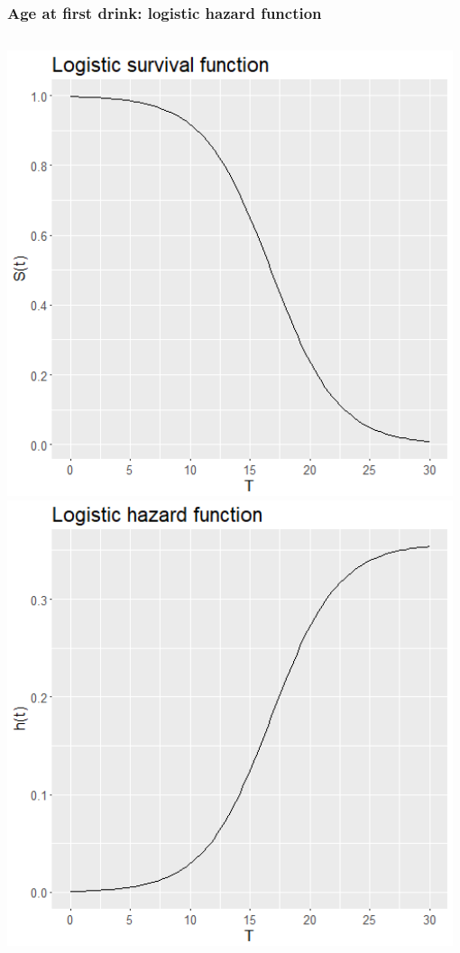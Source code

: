 \begin{frame}
\frametitle{Age at first drink: logistic hazard function}
\begin{columns}
\includegraphics[width=0.98\textwidth]{Figures/drink_surv_log.png}
\includegraphics[width=0.98\textwidth]{Figures/drink_haz_log.png}
\end{columns}
\end{frame}

